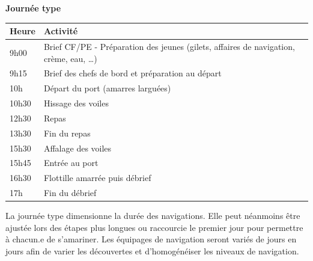 
\begin{center}
{\huge \textbf{Journée type}}\\ \vspace{0.5em}

\renewcommand{\arraystretch}{1.40}
\begin{tabular}{|C{3em}|C{12em}|}
\hline
\textbf{Heure} & \textbf{Activité} \\
\hline

9h00  & Brief CF/PE - Préparation des jeunes (gilets, affaires de navigation, crème, eau, …) \\
\hline
9h15 & Brief des chefs de bord et préparation au départ \\
\hline
10h & Départ du port (amarres larguées) \\
\hline
10h30 & Hissage des voiles \\
\hline
12h30 & Repas \\
\hline
13h30 & Fin du repas \\
\hline
15h30 & Affalage des voiles \\
\hline
15h45 & Entrée au port \\
\hline
16h30 & Flottille amarrée puis débrief \\
\hline
17h & Fin du débrief \\
\hline
\end{tabular}
\end{center}

\vspace{1cm}
La journée type dimensionne la durée des navigations. 
Elle peut néanmoins être ajustée lors des étapes plus longues ou raccourcie le premier jour pour permettre à chacun.e de s'amariner. 
Les équipages de navigation seront variés de jours en jours afin de varier les découvertes et d'homogénéiser les niveaux de navigation. 
